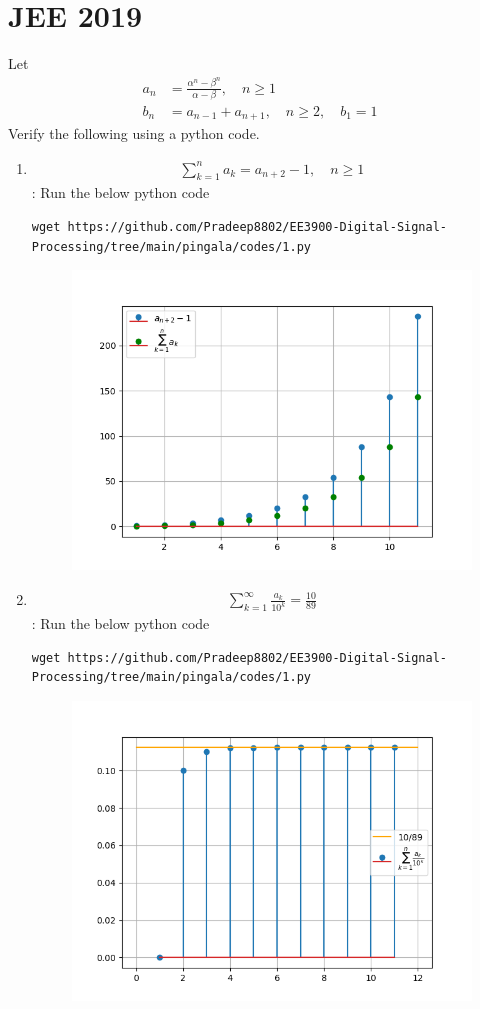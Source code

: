 \documentclass[journal,12pt,twocolumn]{IEEEtran}
\renewcommand\thesection{\arabic{section}}
\begin{document}
\section{JEE 2019}
Let 
\begin{align}
a_n &= \frac{\alpha^{n}-\beta^{n}}{\alpha - \beta}, \quad n \ge 1
\\
b_n &= a_{n-1} + a_{n+1}, \quad n \ge 2, \quad b_1 =1
\label{eq:diff_eqn}
\end{align}
Verify the following using a python code.
\begin{enumerate}[label=\thesection.\arabic*
,ref=\thesection.\theenumi]
\item 
\begin{align}
	\sum_{k=1}^{n}a_k = a_{n+2}-1, \quad n \ge 1
\end{align}
\solution:
Run the below python code 
\begin{lstlisting}
wget https://github.com/Pradeep8802/EE3900-Digital-Signal-Processing/tree/main/pingala/codes/1.py
\end{lstlisting}
\begin{figure}[h]
	\centering
	\includegraphics[width=0.7\columnwidth]{./figs/1.1.png}
	\caption{}
\end{figure}
\item 
\begin{align}
	\sum_{k=1}^{\infty}\frac{a_k}{10^k} =\frac{10}{89}
\end{align}
\solution:
Run the below python code 
\begin{lstlisting}
wget https://github.com/Pradeep8802/EE3900-Digital-Signal-Processing/tree/main/pingala/codes/1.py
\end{lstlisting}
\begin{figure}[h]
	\centering
	\includegraphics[width=0.7\columnwidth]{./figs/1.2.png}

\end{figure}
\end{enumerate}
\end{document}
